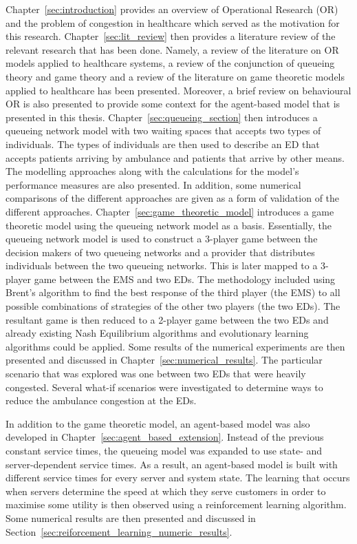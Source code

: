 Chapter~\ref{sec:introduction} provides an overview of Operational Research
(OR) and the problem of congestion in healthcare which served as the
motivation for this research.
Chapter~\ref{sec:lit_review} then provides a literature review of the
relevant research that has been done.
Namely, a review of the literature on OR models applied to healthcare
systems, a review of the conjunction of queueing theory and game theory and a
review of the literature on game theoretic models applied to healthcare has
been presented.
Moreover, a brief review on behavioural OR is also presented to provide some
context for the agent-based model that is presented in this thesis.
Chapter~\ref{sec:queueing_section} then introduces a queueing network model
with two waiting spaces that accepts two types of individuals.
The types of individuals are then used to describe an ED that accepts
patients arriving by ambulance and patients that arrive by other means.
The modelling approaches along with the calculations for the model's
performance measures are also presented.
In addition, some numerical comparisons of the different approaches are
given as a form of validation of the different approaches.
Chapter~\ref{sec:game_theoretic_model} introduces a game theoretic model
using the queueing network model as a basis.
Essentially, the queueing network model is used to construct a 3-player game
between the decision makers of two queueing networks and a provider that
distributes individuals between the two queueing networks.
This is later mapped to a 3-player game between the EMS and two EDs.
The methodology included using Brent's algorithm to find the best response of
the third player (the EMS) to all possible combinations of strategies of the
other two players (the two EDs).
The resultant game is then reduced to a 2-player game between the two EDs
and already existing Nash Equilibrium algorithms and evolutionary learning
algorithms could be applied.
Some results of the numerical experiments are then presented and discussed in
Chapter~\ref{sec:numerical_results}.
The particular scenario that was explored was one between two EDs that
were heavily congested.
Several what-if scenarios were investigated to determine ways to reduce the
ambulance congestion at the EDs.

In addition to the game theoretic model, an agent-based model was also
developed in Chapter~\ref{sec:agent_based_extension}.
Instead of the previous constant service times, the queueing model was expanded
to use state- and server-dependent service times.
As a result, an agent-based model is built with different service times for
every server and system state.
The learning that occurs when servers determine the speed at which they serve
customers in order to maximise some utility is then observed using a
reinforcement learning algorithm.
Some numerical results are then presented and discussed in
Section~\ref{sec:reiforcement_learning_numeric_results}.


